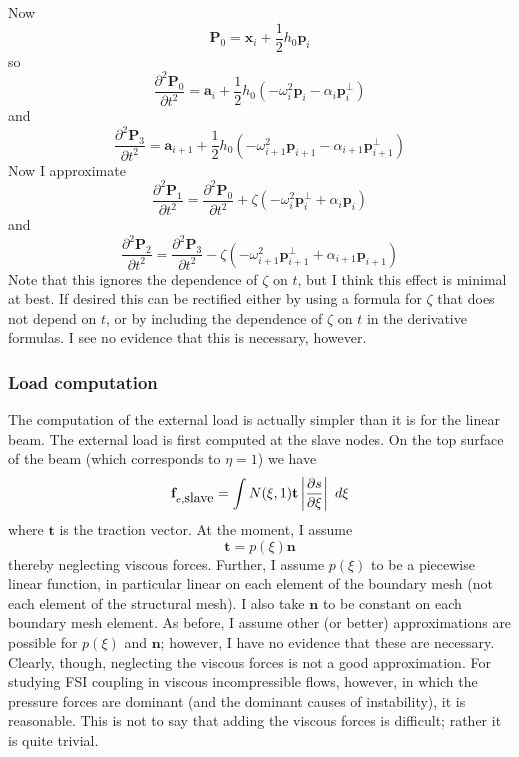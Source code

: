 \documentclass{article}
\begin{document}
Now
\[ \mathbf{P}_0 = \mathbf{x}_i + \frac{1}{2}h_0 \mathbf{p}_i \]
so
\begin{equation}  \frac{\partial^2 \mathbf{P}_0}{\partial t^2} = \mathbf{a}_i + \frac{1}{2}h_0 \left(-\omega_i^2 \mathbf{p}_i -\alpha_i \mathbf{p}_i^{\bot}\right) \label{eq:eq10700} \end{equation}
and 
\begin{equation}  \frac{\partial^2 \mathbf{P}_3}{\partial t^2} = \mathbf{a}_{i+1} + \frac{1}{2}h_0 \left(-\omega_{i+1}^2 \mathbf{p}_{i+1} -\alpha_{i+1} \mathbf{p}_{i+1}^{\bot}\right)  \label{eq:eq10800} \end{equation}
Now I approximate
\begin{equation} \frac{\partial^2 \mathbf{P}_1}{\partial t^2} = \frac{\partial^2 \mathbf{P}_0}{\partial t^2} + \zeta \left( -\omega_i^2\mathbf{p}_i^{\bot}+\alpha_i \mathbf{p}_i \right) \label{eq:eq10900} \end{equation}
and
\begin{equation} \frac{\partial^2 \mathbf{P}_2}{\partial t^2} = \frac{\partial^2 \mathbf{P}_3}{\partial t^2} - \zeta \left( -\omega_{i+1}^2\mathbf{p}_{i+1}^{\bot}+\alpha_{i+1} \mathbf{p}_{i+1} \right) \label{eq:eq11000} \end{equation}
Note that this ignores the dependence of $\zeta$ on $t$, but I think this effect is minimal at best.  
If desired this can be rectified either by using a formula for $\zeta$ that does not depend on $t$, or by including the dependence of $\zeta$ on $t$ in the derivative formulas.
I see no evidence that this is necessary, however.

\subsubsection{Load computation}
The computation of the external load is actually simpler than it is for the linear beam.
The external load is first computed at the slave nodes.
On the top surface of the beam (which corresponds to $\eta = 1$) we have
\begin{equation} {\bf f}_{e, \mbox{slave}} = \int N(\xi, 1) \mathbf{t} \left| \frac{\partial s}{\partial \xi}\right| \ d\xi \label{eq:eq11200} \end{equation}
where $\mathbf{t}$ is the traction vector.
At the moment, I assume 
\[ \mathbf{t} = p(\xi) \mathbf{n} \]
thereby neglecting viscous forces.  
Further, I assume $p(\xi)$ to be a piecewise linear function, in particular linear on each element of the boundary mesh (not each element of the structural mesh).
I also take $\mathbf{n}$ to be constant on each boundary mesh element.
As before, I assume other (or better) approximations are possible for $p(\xi)$ and $\mathbf{n}$; however, I have no evidence that these are necessary.
Clearly, though, neglecting the viscous forces is not a good approximation.  
For studying FSI coupling in viscous incompressible flows, however, in which the pressure forces are dominant (and the dominant causes of instability), it is reasonable.  
This is not to say that adding the viscous forces is difficult; rather it is quite trivial.
\end{document}

